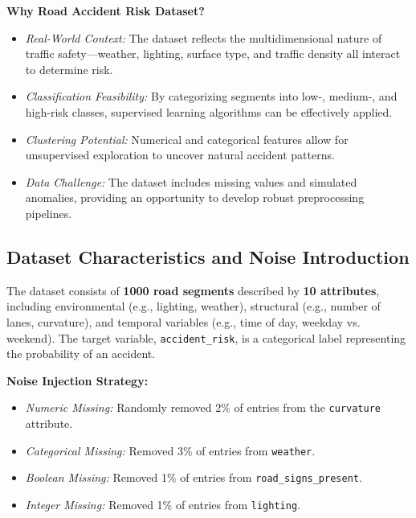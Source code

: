 \documentclass[12pt,a4paper]{article}
\begin{document}
\begin{infobox}{}
\textbf{Why Road Accident Risk Dataset?}
\begin{itemize}
    \item \textit{Real-World Context:} The dataset reflects the multidimensional nature of traffic safety—weather, lighting, surface type, and traffic density all interact to determine risk.
    \item \textit{Classification Feasibility:} By categorizing segments into low-, medium-, and high-risk classes, supervised learning algorithms can be effectively applied.
    \item \textit{Clustering Potential:} Numerical and categorical features allow for unsupervised exploration to uncover natural accident patterns.
    \item \textit{Data Challenge:} The dataset includes missing values and simulated anomalies, providing an opportunity to develop robust preprocessing pipelines.
\end{itemize}
\end{infobox}

\subsection{Dataset Characteristics and Noise Introduction}

The dataset consists of \textbf{1000 road segments} described by \textbf{10 attributes}, including environmental (e.g., lighting, weather), structural (e.g., number of lanes, curvature), and temporal variables (e.g., time of day, weekday vs. weekend). The target variable, \texttt{accident\_risk}, is a categorical label representing the probability of an accident.

\begin{resultbox}{}
\textbf{Noise Injection Strategy:}

\begin{itemize}
    \item \textit{Numeric Missing:} Randomly removed 2\% of entries from the \texttt{curvature} attribute.
    \item \textit{Categorical Missing:} Removed 3\% of entries from \texttt{weather}.
    \item \textit{Boolean Missing:} Removed 1\% of entries from \texttt{road\_signs\_present}.
    \item \textit{Integer Missing:} Removed 1\% of entries from \texttt{lighting}.
\end{itemize}
\end{resultbox}
\end{document}
